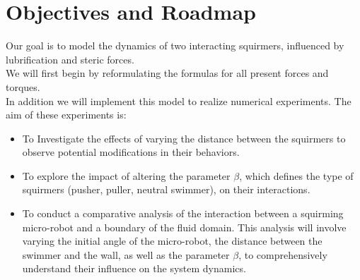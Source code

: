 \documentclass{article}
\begin{document}
\section{Objectives and Roadmap}
Our goal is to model the dynamics of two interacting squirmers, influenced by lubrification \cite{Brumley} and steric forces.\\
We will first begin by reformulating the formulas for all present forces and torques.\cite{Brumley}\cite{Lauga}\\
In addition we will implement this model to realize numerical experiments. The aim of these experiments is: 
\begin{itemize}
    \item To Investigate the effects of varying the distance between the squirmers to observe
    potential modifications in their behaviors.
    \item To explore the impact of altering the parameter $\beta$, which defines the
    type of squirmers (pusher, puller, neutral swimmer), on their interactions.
    \item To conduct a comparative analysis of the interaction between a squirming micro-robot and a 
    boundary of the fluid domain. This analysis will involve varying the initial angle of the micro-robot, the distance between the swimmer and the wall, as well as the parameter $\beta$, 
    to comprehensively understand their influence on the system dynamics.
\end{itemize}
\end{document}
